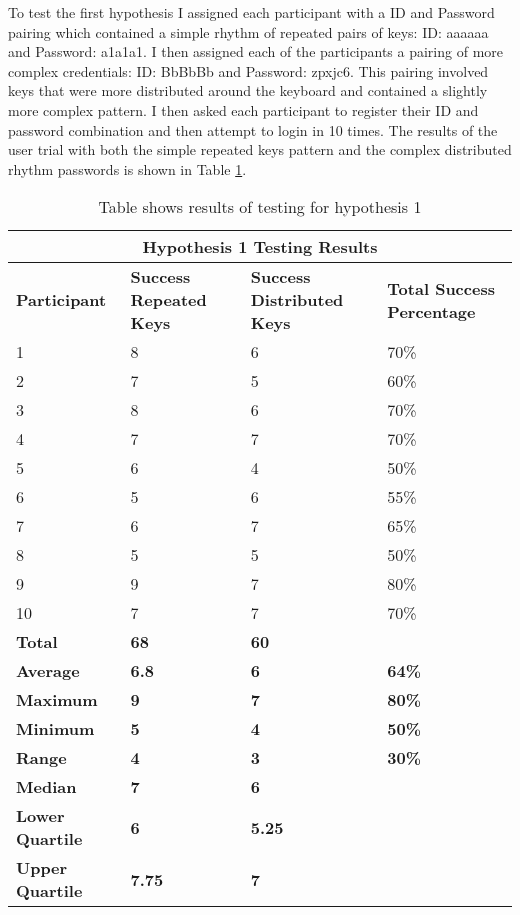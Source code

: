 \documentclass{article}
\begin{document}
To test the first hypothesis I assigned each participant with a ID and Password pairing which contained a simple rhythm of repeated pairs of keys: ID: aaaaaa and Password: a1a1a1. I then assigned each of the participants a pairing of more complex credentials: ID: BbBbBb and Password: zpxjc6. This pairing involved keys that were more distributed around the keyboard and contained a slightly more complex pattern. I then asked each participant to register their ID and password combination and then attempt to login in 10 times. The results of the user trial with both the simple repeated keys pattern and the complex distributed rhythm passwords is shown in Table \ref{table:1}. 

{
\begin{table} [H]
\centering
\begin{tabular}{ |p{2cm}|p{4cm}|p{4cm}| p{4cm} | }
\hline
\multicolumn{4}{|c|}{\textbf{Hypothesis 1 Testing Results}} \\
\hline
\textbf{Participant} & \textbf{Success Repeated Keys} & \textbf{Success Distributed Keys} & \textbf{Total Success Percentage} \\
\hline
1 & 8 & 6 & 70\% \\
\hline
2 & 7 & 5 & 60\% \\
\hline
3 & 8 & 6 & 70\% \\
\hline
4 & 7 & 7 & 70\%  \\
\hline
5 & 6 & 4 & 50\% \\
\hline
6 & 5 & 6 & 55\% \\
\hline
7 & 6 & 7 & 65\% \\
\hline
8 & 5 & 5 & 50\% \\
\hline
9 & 9 & 7 & 80\% \\
\hline
10 & 7 & 7 & 70\% \\
\hline
\textbf{Total} & \textbf{68} & \textbf{60} & \\
\hline
\textbf{Average} & \textbf{6.8} & \textbf{6} & \textbf{64\%} \\
\hline
\textbf{Maximum} & \textbf{9} & \textbf{7} & \textbf{80\%} \\
\hline
\textbf{Minimum} & \textbf{5} & \textbf{4} & \textbf{50\%} \\
\hline
\textbf{Range} & \textbf{4} & \textbf{3} & \textbf{30\%} \\
\hline
\textbf{Median} & \textbf{7} & \textbf{6} & \\
\hline
\textbf{Lower Quartile} & \textbf{6} & \textbf{5.25} & \\
\hline
\textbf{Upper Quartile} & \textbf{7.75} & \textbf{7} & \\
\hline
\end{tabular}
\caption{Table shows results of testing for hypothesis 1}
\label{table:1}
\end{table}
}
\end{document}
